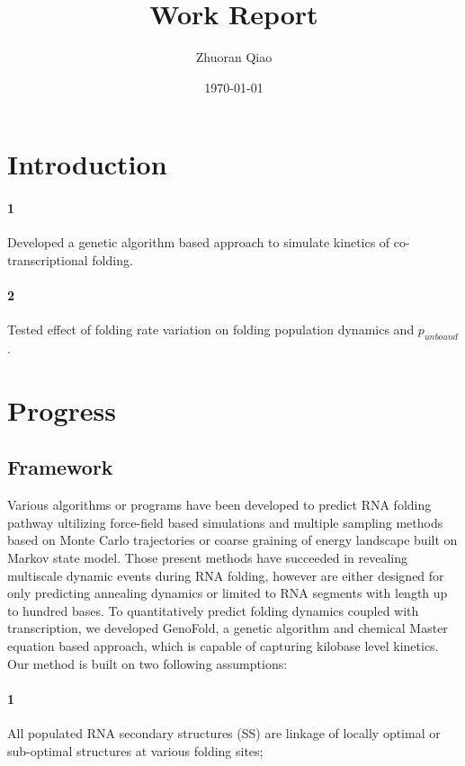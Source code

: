 \documentclass[11pt, a4paper]{article}
\begin{document}
\title{Work Report}
\author{Zhuoran Qiao}
\date{\today}

\maketitle

\section{Introduction}

\paragraph{1} Developed a genetic algorithm based approach to simulate kinetics of co-transcriptional folding.
\paragraph{2} Tested effect of folding rate variation on folding population dynamics and $p_{unbound}$.


\section{Progress}
\subsection{Framework}
Various algorithms or programs have been developed to predict RNA folding pathway ultilizing force-field based simulations\cite{RaviprasadAduri2007} and multiple sampling methods based on Monte Carlo trajectories\cite{Gultyaev1995}\cite{Clote} or coarse graining of energy landscape built on Markov state model\cite{Wolfinger}\cite{Sun2018}. Those present methods have succeeded in revealing multiscale dynamic events during RNA folding, however are either designed for only predicting
annealing dynamics or limited to RNA segments with length up to hundred bases. To quantitatively predict folding dynamics coupled with transcription,
we developed GenoFold, a genetic algorithm and chemical Master equation based approach, which is capable of capturing kilobase level kinetics.
 Our method is built on two following assumptions:
\paragraph{1} All populated RNA secondary structures (SS) are linkage of locally optimal or sub-optimal structures at various folding sites;
\end{document}
